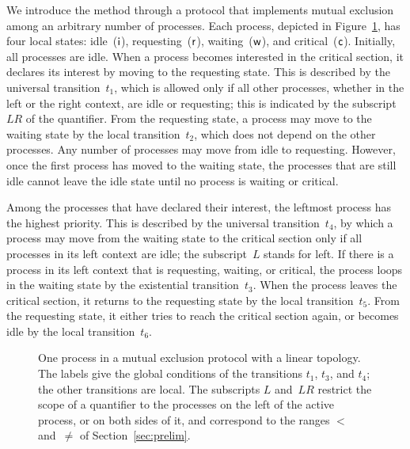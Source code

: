 We introduce the method through a protocol that implements mutual exclusion
among an arbitrary number of processes. Each process, depicted in
Figure~\ref{fig:mutex}, has four local states: idle~($\mathsf{i}$),
requesting~($\mathsf{r}$), waiting~($\mathsf{w}$), and critical~($\mathsf{c}$). Initially, all
processes are idle. When a process becomes interested in the critical section,
it declares its interest by moving to the requesting state. This is described
by the universal transition~$t_1$, which is allowed only if all other
processes, whether in the left or the right context, are idle or requesting;
this is indicated by the subscript~$LR$ of the quantifier. From the requesting
state, a process may move to the waiting state by the local transition~$t_2$,
which does not depend on the other processes. Any number of processes may
move from idle to requesting. However, once the first process has moved to the
waiting state, the processes that are still idle cannot leave the idle state
until no process is waiting or critical.

Among the processes that have declared their interest, the leftmost process
has the highest priority. This is described by the universal
transition~$t_4$, by which a process may move from the waiting state to the
critical section only if all processes in its left context are idle; the
subscript~$L$ stands for left. If there is a process in its left context that is
requesting, waiting, or critical, the process loops in the waiting state by the
existential transition~$t_3$. When the process leaves the critical section, it
returns to the requesting state by the local transition~$t_5$. From the
requesting state, it either tries to reach the critical section again, or
becomes idle by the local transition~$t_6$.

\begin{figure}[t]
\centering
{}
\caption{One process in a mutual exclusion protocol with a linear topology.
The labels give the global conditions of the transitions $t_1$, $t_3$, and
$t_4$; the other transitions are local. The subscripts $L$ and~$LR$ restrict
the scope of a quantifier to the processes on the left of the active process,
or on both sides of it, and correspond to the ranges $<$ and~$\neq$ of
Section~\ref{sec:prelim}.}
\label{fig:mutex}
\end{figure}

